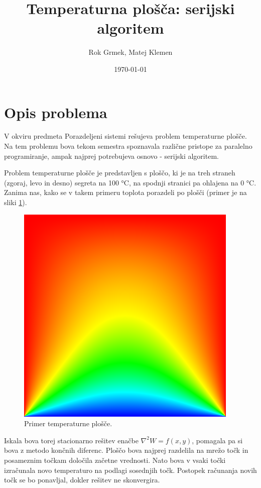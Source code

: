 \documentclass[a4paper,11pt]{article}
\title{Temperaturna plošča: serijski algoritem}
\author{Rok Grmek, Matej Klemen}
\date{\today}
\begin{document}
\maketitle

\section{Opis problema}

\indent \par V okviru predmeta Porazdeljeni sistemi rešujeva problem temperaturne plošče. Na tem problemu bova tekom semestra spoznavala različne pristope za paralelno programiranje, ampak najprej potrebujeva osnovo - serijski algoritem.

Problem temperaturne plošče je predstavljen s ploščo, ki je na treh straneh (zgoraj, levo in desno) segreta na 100 °C, na spodnji stranici pa ohlajena na 0 °C. Zanima nas, kako se v takem primeru toplota porazdeli po plošči (primer je na sliki \ref{primer-temperaturne-plosce}).

\begin{figure}[H]
\begin{center}
\includegraphics[scale=0.6]{primer-temperaturne-plosce.png}
\end{center}
\caption{Primer temperaturne plošče.}
\label{primer-temperaturne-plosce}
\end{figure}

Iskala bova torej stacionarno rešitev enačbe \(\nabla^2 W = f(x, y)\), pomagala pa si bova z metodo končnih diferenc. Ploščo bova najprej razdelila na mrežo točk in posameznim točkam določila začetne vrednosti. Nato bova v vsaki točki izračunala novo temperaturo na podlagi sosednjih točk. Postopek računanja novih točk se bo ponavljal, dokler rešitev ne skonvergira.
\end{document}
